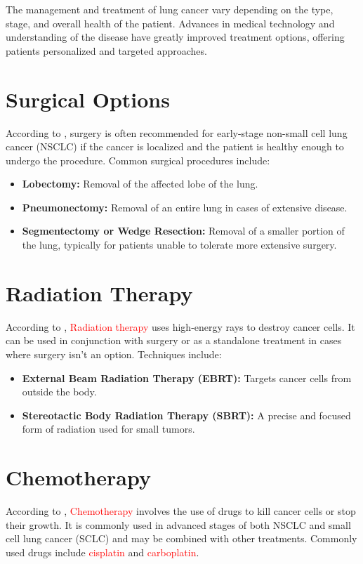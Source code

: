 \begin{remark}
The management and treatment of lung cancer vary depending on the type, stage, and overall health of the patient. Advances in medical technology and understanding of the disease have greatly improved treatment options, offering patients personalized and targeted approaches.
\end{remark}

\section{Surgical Options}
According to \cite{hoy2019surgical}, surgery is often recommended for early-stage non-small cell lung cancer (NSCLC) if the cancer is localized and the patient is healthy enough to undergo the procedure. Common surgical procedures include:
\begin{highlight}
\begin{itemize}
    \item \textbf{Lobectomy:} Removal of the affected lobe of the lung.
    \item \textbf{Pneumonectomy:} Removal of an entire lung in cases of extensive disease.
    \item \textbf{Segmentectomy or Wedge Resection:} Removal of a smaller portion of the lung, typically for patients unable to tolerate more extensive surgery.
\end{itemize}
\end{highlight}

\section{Radiation Therapy}
According to \cite{de2013state}, \textcolor{red}{Radiation therapy} uses high-energy rays to destroy cancer cells. It can be used in conjunction with surgery or as a standalone treatment in cases where surgery isn’t an option. Techniques include:
\begin{highlight}
\begin{itemize}
    \item \textbf{External Beam Radiation Therapy (EBRT):} Targets cancer cells from outside the body.
    \item \textbf{Stereotactic Body Radiation Therapy (SBRT):} A precise and focused form of radiation used for small tumors.
\end{itemize}
\end{highlight}

\section{Chemotherapy}
\begin{outline}
According to \cite{ihde1992chemotherapy}, \textcolor{red}{Chemotherapy} involves the use of drugs to kill cancer cells or stop their growth. It is commonly used in advanced stages of both NSCLC and small cell lung cancer (SCLC) and may be combined with other treatments. Commonly used drugs include \textcolor{red}{cisplatin} and \textcolor{red}{carboplatin}.
\end{outline}

